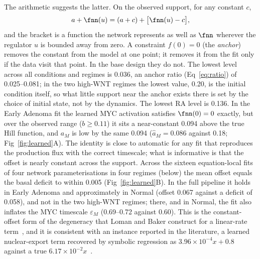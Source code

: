 The arithmetic suggests the latter. On the observed support, for any constant
$c$,
\begin{equation}
a + \fnn(u) = (a + c) + \big[\fnn(u) - c\big],
\label{eq:compensation}
\end{equation}
and the bracket is a function the network represents as well as $\fnn$
wherever the regulator $u$ is bounded away from zero. A constraint $f(0)=0$ (the
\emph{anchor}) removes the constant from the model at one point; it removes it
from the fit only if the data visit that point. In the base design they do not.
The lowest \bcat{} level across all conditions and regimes is 0.036, an anchor
ratio (Eq~\eqref{eq:ratio}) of 0.025--0.081; in the two high-WNT regimes the
lowest value, 0.20, is the initial condition itself, so what little support
near the anchor exists there is set by the choice of initial state, not by the
dynamics. The lowest RA level is 0.136. In the Early Adenoma fit the learned MYC
activation satisfies $\fnn(0)=0$ exactly, but over the observed range
($b\ge0.11$) it sits a near-constant 0.094 above the true Hill function, and
$a_M$ is low by the same 0.094 ($\hat a_M=0.086$ against 0.18;
Fig~\ref{fig:learned}A). The identity is close to automatic for any fit that
reproduces the production flux with the correct timescale; what is informative
is that the offset is nearly constant across the support. Across the sixteen
equation-local fits of four network parameterisations in four regimes (below)
the mean offset equals the basal deficit to within 0.005
(Fig~\ref{fig:learned}B). In the full pipeline it holds in Early Adenoma and
approximately in Normal (offset 0.067 against a deficit of 0.058), and not in
the two high-WNT regimes; there, and in Normal, the fit also inflates the MYC
timescale $\varepsilon_M$ (0.69--0.72 against 0.60). This is the
constant-offset form of the degeneracy that Loman and Baker construct for a
linear-rate term~\citep{loman2025identifiability}, and it is consistent with an
instance reported in the literature, a learned nuclear-export term recovered
by symbolic regression as $3.96\times10^{-4}x+0.8$ against a true
$6.17\times10^{-2}x$~\citep{philipps2025ude}.

